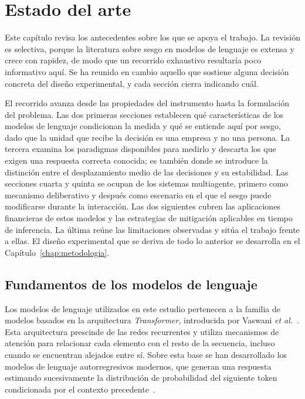 
\chapter{Estado del arte}
\label{chap:estado_arte}

Este capítulo revisa los antecedentes sobre los que se apoya el trabajo. La revisión es selectiva, porque la literatura sobre sesgo en modelos de lenguaje es extensa y crece con rapidez, de modo que un recorrido exhaustivo resultaría poco informativo aquí. Se ha reunido en cambio aquello que sostiene alguna decisión concreta del diseño experimental, y cada sección cierra indicando cuál.

El recorrido avanza desde las propiedades del instrumento hasta la formulación del problema. Las dos primeras secciones establecen qué características de los modelos de lenguaje condicionan la medida y qué se entiende aquí por sesgo, dado que la unidad que recibe la decisión es una empresa y no una persona. La tercera examina los paradigmas disponibles para medirlo y descarta los que exigen una respuesta correcta conocida; es también donde se introduce la distinción entre el desplazamiento medio de las decisiones y su estabilidad. Las secciones cuarta y quinta se ocupan de los sistemas multiagente, primero como mecanismo deliberativo y después como escenario en el que el sesgo puede modificarse durante la interacción. Las dos siguientes cubren las aplicaciones financieras de estos modelos y las estrategias de mitigación aplicables en tiempo de inferencia. La última reúne las limitaciones observadas y sitúa el trabajo frente a ellas. El diseño experimental que se deriva de todo lo anterior se desarrolla en el Capítulo~\ref{chap:metodologia}.

\section{Fundamentos de los modelos de lenguaje}
\label{sec:fundamentos_llm}

Los modelos de lenguaje utilizados en este estudio pertenecen a la familia de modelos basados en la arquitectura \textit{Transformer}, introducida por Vaswani \textit{et al.}~\cite{vaswani2017attention}. Esta arquitectura prescinde de las redes recurrentes y utiliza mecanismos de atención para relacionar cada elemento con el resto de la secuencia, incluso cuando se encuentran alejados entre sí. Sobre esta base se han desarrollado los modelos de lenguaje autorregresivos modernos, que generan una respuesta estimando sucesivamente la distribución de probabilidad del siguiente token condicionada por el contexto precedente~\cite{brown2020language}.


